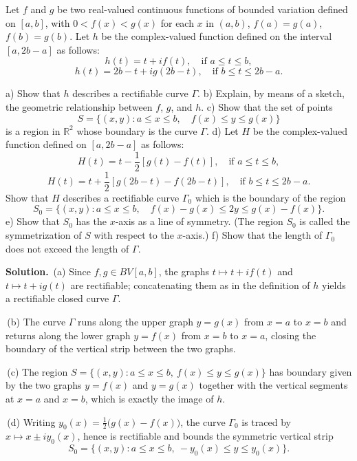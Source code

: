 \begin{problembox}
Let $f$ and $g$ be two real-valued continuous functions of bounded variation defined on $[a, b]$, with $0 < f(x) < g(x)$ for each $x$ in $(a, b)$, $f(a) = g(a)$, $f(b) = g(b)$. Let $h$ be the complex-valued function defined on the interval $[a, 2b - a]$ as follows:
\[h(t) = t + i f(t), \quad \text{if } a \leq t \leq b,\]
\[h(t) = 2b - t + ig(2b - t), \quad \text{if } b \leq t \leq 2b - a.\]

a) Show that $h$ describes a rectifiable curve $\Gamma$.
b) Explain, by means of a sketch, the geometric relationship between $f$, $g$, and $h$.
c) Show that the set of points
\[S = \{ (x, y) : a \leq x \leq b, \quad f(x) \leq y \leq g(x) \}\]
is a region in $\mathbb{R}^2$ whose boundary is the curve $\Gamma$.
d) Let $H$ be the complex-valued function defined on $[a, 2b - a]$ as follows:
\[H(t) = t - \frac{1}{2} [g(t) - f(t)], \quad \text{if } a \leq t \leq b,\]
\[H(t) = t + \frac{1}{2} [g(2b - t) - f(2b - t)], \quad \text{if } b \leq t \leq 2b - a.\]
Show that $H$ describes a rectifiable curve $\Gamma_0$ which is the boundary of the region
\[S_0 = \{ (x, y) : a \leq x \leq b, \quad f(x) - g(x) \leq 2y \leq g(x) - f(x) \}.\]
e) Show that $S_0$ has the $x$-axis as a line of symmetry. (The region $S_0$ is called the symmetrization of $S$ with respect to the $x$-axis.)
f) Show that the length of $\Gamma_0$ does not exceed the length of $\Gamma$.
\end{problembox}

\noindent\textbf{Solution.}
\,(a) Since $f,g\in BV[a,b]$, the graphs $t\mapsto t+if(t)$ and $t\mapsto t+ig(t)$ are rectifiable; concatenating them as in the definition of $h$ yields a rectifiable closed curve $\Gamma$.

\,(b) The curve $\Gamma$ runs along the upper graph $y=g(x)$ from $x=a$ to $x=b$ and returns along the lower graph $y=f(x)$ from $x=b$ to $x=a$, closing the boundary of the vertical strip between the two graphs.

\,(c) The region $S=\{(x,y): a\le x\le b,\ f(x)\le y\le g(x)\}$ has boundary given by the two graphs $y=f(x)$ and $y=g(x)$ together with the vertical segments at $x=a$ and $x=b$, which is exactly the image of $h$.

\,(d) Writing $y_0(x)=\tfrac12\big(g(x)-f(x)\big)$, the curve $\Gamma_0$ is traced by $x\mapsto x\pm i y_0(x)$, hence is rectifiable and bounds the symmetric vertical strip
\[S_0=\{(x,y): a\le x\le b,\ -y_0(x)\le y\le y_0(x)\}.\]

